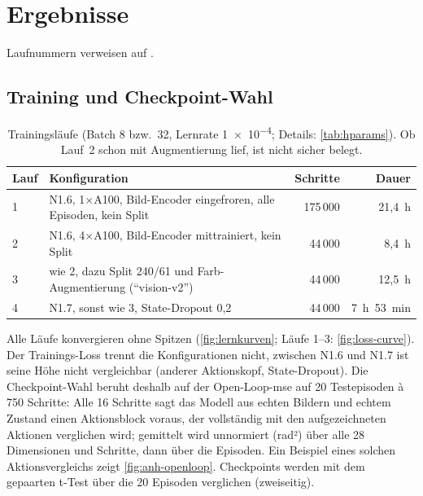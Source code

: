 
\chapter{Ergebnisse}
\label{chap:ergebnisse}

Laufnummern verweisen auf .

\section{Training und Checkpoint-Wahl}
\label{sec:erg-training}
\label{sec:trainingsverlauf}
\label{sec:lernkurven}
\label{sec:lauf3}

\begin{table}[htb]
  \centering
  \begin{tabularx}{\linewidth}{lXrr}
    \toprule
    Lauf & Konfiguration & Schritte & Dauer \\
    \midrule
    1 & N1.6, 1$\times$A100, Bild-Encoder eingefroren, alle Episoden, kein Split & 175\,000 & 21,4~h \\
    2 & N1.6, 4$\times$A100, Bild-Encoder mittrainiert, kein Split & 44\,000 & 8,4~h \\
    3 & wie 2, dazu Split 240/61 und Farb-Augmentierung (\enquote{vision-v2}) & 44\,000 & 12,5~h \\
    4 & N1.7, sonst wie 3, State-Dropout 0,2 & 44\,000 & 7~h~53~min \\
    \bottomrule
  \end{tabularx}
  \caption[Trainingsläufe]{Trainingsläufe (Batch 8 bzw.\ 32, Lernrate \num{1e-4}; Details:
    \cref{tab:hparams}). Ob Lauf~2 schon mit Augmentierung lief, ist nicht sicher belegt.}
  \label{tab:laeufe}
\end{table}

Alle Läufe konvergieren ohne Spitzen (\cref{fig:lernkurven}; Läufe 1--3:
\cref{fig:loss-curve}). Der Trainings-Loss trennt die Konfigurationen nicht, zwischen N1.6 und
N1.7 ist seine Höhe nicht vergleichbar (anderer Aktionskopf, State-Dropout). Die
Checkpoint-Wahl beruht deshalb auf der Open-Loop-\ac{mse} auf 20 Testepisoden à 750 Schritte:
Alle 16 Schritte sagt das Modell aus echten Bildern und echtem Zustand einen Aktionsblock
voraus, der vollständig mit den aufgezeichneten Aktionen verglichen wird; gemittelt wird
unnormiert (rad²) über alle 28 Dimensionen und Schritte, dann über die Episoden. Ein Beispiel eines solchen
Aktionsvergleichs zeigt \cref{fig:anh-openloop}.
Checkpoints werden mit dem gepaarten t-Test über die 20 Episoden verglichen (zweiseitig).

